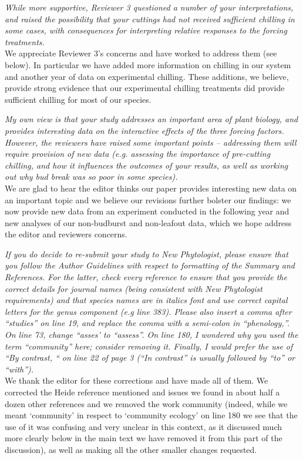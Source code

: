 \documentclass[11pt,a4paper]{article}
\begin{document}
\emph{While more supportive, Reviewer 3 questioned a number of your interpretations, and raised the
possibility that your cuttings had not received sufficient chilling in some cases, with
consequences for interpreting relative responses to the forcing treatments.}\\

We appreciate Reviewer 3's concerns and have worked to address them (see below). In particular we have added more information on chilling in our system and another year of data on experimental chilling. These additions, we believe, provide strong evidence that our experimental chilling treatments did provide sufficient chilling for most of our species. 

\emph{My own view is that your study addresses an important area of plant biology, and provides
interesting data on the interactive effects of the three forcing factors.  However, the
reviewers have raised some important points – addressing them will require provision of new
data (e.g. assessing the importance of pre-cutting chilling, and how it influences the
outcomes of your results, as well as working out why bud break was so poor in some species).}\\

We are glad to hear the editor thinks our paper provides interesting new data on an important topic and we believe our revisions further bolster our findings: we now provide new data from an experiment conducted in the following year and new analyses of our non-budburst and non-leafout data, which we hope address the editor and reviewers concerns. 

\emph{If you do decide to re-submit your study to New Phytologist, please ensure that you follow
the Author Guidelines with respect to formatting of the Summary and References.  For the
latter, check every reference to ensure that you provide the correct details for journal
names (being consistent with New Phytologist requirements) and that species names are in
italics font and use correct capital letters for the genus component (e.g line 383).  Please
also insert a comma after “studies” on line 19, and replace the comma with a semi-colon in
“phenology,”.  On line 73, change “asses’ to “assess”. On line 180, I wondered why you used
the term “community” here; consider removing it.  Finally, I would prefer the use of “By
contrast, “ on line 22 of page 3 (“In contrast” is usually followed by “to” or “with”).}\\

We thank the editor for these corrections and have made all of them. We corrected the Heide reference mentioned and issues we found in about half a dozen other references and we removed the work community (indeed, while we meant `community' in respect to `community ecology' on line 180 we see that the use of it was confusing and very unclear in this context, as it discussed much more clearly below in the main text we have removed it from this part of the discussion), as well as making all the other smaller changes requested. \\
\end{document}
